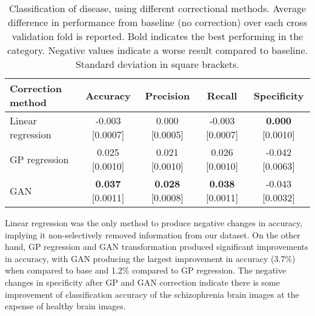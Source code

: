 \begin{table}[!ht]
  \centering
  \caption{Classification of disease, using different correctional methods. Average difference in performance from baseline (no correction) over each cross validation fold is reported. Bold indicates the best performing in the category. Negative values indicate a worse result compared to baseline. Standard deviation in square brackets.}
    \begin{tabular}{l|cccc}
    \toprule
    \textbf{Correction method} & \textbf{Accuracy} & \textbf{Precision}& \textbf{Recall} & \textbf{Specificity}\\
    \midrule
    Linear regression   &  -0.003 [0.0007] & 0.000 [0.0005]  & -0.003 [0.0007]  & \textbf{0.000} [0.0010]\\
    GP regression    &  0.025 [0.0010] & 0.021 [0.0010]  & 0.026 [0.0010] & -0.042 [0.0063]\\
    GAN    & \textbf{0.037} [0.0011] & \textbf{0.028} [0.0008]& \textbf{0.038} [0.0011]  & -0.043 [0.0032]\\
    \bottomrule
    \end{tabular}%
  \label{tab:classify_disease}%
\end{table}

Linear regression was the only method to produce negative changes in accuracy, implying it non-selectively removed information from our dataset. On the other hand, GP regression and GAN transformation produced significant improvements in accuracy, with GAN producing the largest improvement in accuracy (3.7\%) when compared to base and 1.2\% compared to GP regression. The negative changes in specificity after GP and GAN correction indicate there is some improvement of classification accuracy of the schizophrenia brain images at the expense of healthy brain images.

